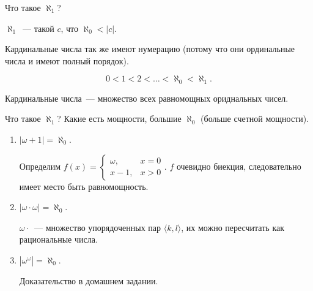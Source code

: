 Что такое $\aleph_1$?
\begin{definition}
    $\aleph_1$~--- такой $c$, что $\aleph_0 < |c|$.
\end{definition}

\begin{note}
    Кардинальные числа так же имеют нумерацию (потому что они ординальные числа и имеют полный порядок).

    \[ 0 < 1 < 2 < \dots < \aleph_0 < \aleph_1. \]
\end{note}

\begin{definition}

    Кардинальные числа~--- множество всех равномощных ориднальных чисел.
\end{definition}

Что такое $\aleph_1$? Какие есть мощности, большие $\aleph_0$ (больше счетной мощности).

\begin{example}
    \begin{enumerate}
        \item $|\omega + 1| = \aleph_0$.

        Определим $f(x) = \begin{cases}
            \omega,& x = 0\\
            x - 1, & x > 0
        \end{cases}$. $f$ очевидно биекция, следовательно имеет место быть равномощность.
        \item $|\omega \cdot \omega| = \aleph_0$.

        $\omega \cdot $~--- множество упорядоченных пар $\langle k, l\rangle$, их можно пересчитать как рациональные числа.
        \item $|\omega^\omega| = \aleph_0$.

        Доказательство в домашнем задании.
    \end{enumerate}
\end{example}

